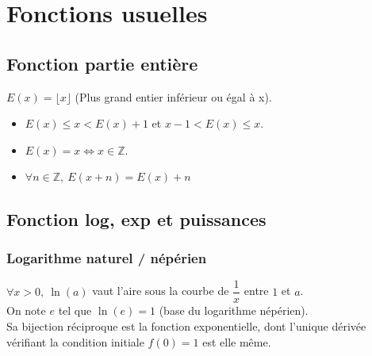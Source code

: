\documentclass[13pt, twoside, a4paper, french]{report}
\begin{document}
\chapter{Fonctions usuelles}\label{ch:fonctions-usuelles}
  
  
  \section{Fonction partie entière}\label{sec:fonction-partie-entiere}
    
    $E(x) = \lfloor x \rfloor$ (Plus grand entier inférieur ou égal à x).\\
    
    \begin{itemize}
      \item $E(x) \le x < E(x) + 1$ et $x-1 < E(x) \le x$.
      \item $E(x) = x \Leftrightarrow x \in \mathbb{Z}$.
      \item $\forall n \in \mathbb{Z},\ E(x + n) = E(x) + n$
    \end{itemize}
  
  
  \section{Fonction log, exp et puissances}\label{sec:fonction-log-exp-puissances}
    
    \subsection{Logarithme naturel / népérien}\label{subsec:logarithme-naturel-/-neperien}
      
      $\forall x > 0,\ \ln(a)$ vaut l'aire sous la courbe de $\dfrac{1}{x}$ entre $1$ et $a$.\\
      On note $e$ tel que $\ln(e) = 1$ (base du logarithme népérien).\\
      Sa bijection réciproque est la fonction exponentielle, dont l'unique dérivée vérifiant la condition initiale $f(0) = 1$ est elle même.\\
      
      \\
  
\end{document}
